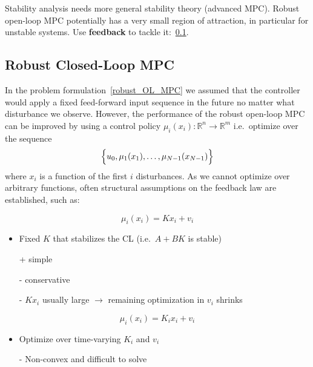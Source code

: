 Stability analysis needs more general stability theory (advanced MPC).
\newpar{}
Robust open-loop MPC potentially has a very small region of attraction, in particular for unstable systems. Use \textbf{feedback} to tackle it:~\ref{robust_CL_MPC}.

\subsection{Robust Closed-Loop MPC}\label{robust_CL_MPC}
In the problem formulation~\ref{robust_OL_MPC} we assumed that the controller would apply a fixed feed-forward input sequence in the future no matter what disturbance we observe. However, the performance of the robust open-loop MPC can be improved by using a control policy $\mu_i(x_i) : \mathbb{R}^n\to \mathbb{R}^m$ i.e.\ optimize over the sequence
\begin{equation*}
    \Bigl\{ u_0, \mu_1(x_1), \ldots, \mu_{N-1}(x_{N-1})\Bigr\}
\end{equation*}
where $x_i$ is a function of the first $i$ disturbances.
\newpar{}
As we cannot optimize over arbitrary functions, often structural assumptions on the feedback law are established, such as:

\begin{equation*}
    \mu_i(x_i) = Kx_i + v_i
\end{equation*}
\begin{itemize}
    \item Fixed $K$ that stabilizes the CL (i.e.\ $A + BK$ is stable)
    \item [+] simple
    \item [-] conservative
    \item [-] $K x_i$ usually large $\rightarrow$ remaining optimization in $v_i$ shrinks
\end{itemize}

\newpar{}
\begin{equation*}
    \mu_i(x_i) = K_i x_i + v_i
\end{equation*}
\begin{itemize}
    \item Optimize over time-varying $K_i$  and $v_i$
    \item [-] Non-convex and difficult to solve
\end{itemize}

